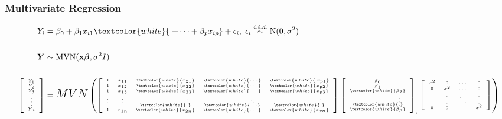\documentclass[xcolor={dvipsnames}]{beamer}
\begin{document}
\frame
{
 \frametitle{Multivariate Regression}
 
 
 \vspace{-.11em}
 
\begin{align*}
Y_i = {}& \beta_0+\beta_1x_{i1} \textcolor{white}{ \;+ \cdots + \beta_p x_{ip}} + \epsilon_i,  \;  \epsilon_i \overset{\tiny i.i.d.}{\sim}  \textrm{N}(0,\sigma^2)\\{}\\
 {\boldsymbol Y} \sim {} &  \textrm{MVN}(\textbf{x}{\boldsymbol\beta},\sigma^2I)\\{}\\
\tiny
\left[\begin{array}{c} Y_1 \\ Y_2 \\ Y_3 \\ \vdots\\ Y_n \end{array} \right] 
= {} & \tiny{\Large \text{$MVN$}} \left(
\left[\begin{array}{ccccc} 1 & x_{11} & \textcolor{white}{x_{21}} &\textcolor{white}{\cdots} & \textcolor{white}{\hspace{.2em}x_{p1}}\\
1 & x_{12} & \textcolor{white}{x_{22}} & \textcolor{white}{\cdots} & \textcolor{white}{x_{p2}}\\ 
1 & x_{13} & \textcolor{white}{x_{23}} & \textcolor{white}{\cdots} & \textcolor{white}{x_{p3}}\\ 
\vdots & \vdots & \textcolor{white}{\vdots} & \textcolor{white}{\ddots} & \textcolor{white}{\vdots}\\ 
1 & x_{1n} & \textcolor{white}{x_{2n}} & \textcolor{white}{\cdots} & \textcolor{white}{x_{pn}}
 \end{array} \right]  
 \left[\begin{array}{c}\beta_0 \\ \beta_1 \\ \textcolor{white}{\beta_2} \\ \textcolor{white}{\vdots}\\ \textcolor{white}{\beta_p} \end{array} \right]_,
 \left[\begin{array}{cccc}\sigma^2&0 & \cdots & 0\\ 
0 &\sigma^2&  \cdots & 0\\
\vdots &\vdots&  \ddots & \vdots\\
0 & 0 &   \cdots & \sigma^2\\ \end{array}\right]\right)\end{align*}

}
\end{document}
